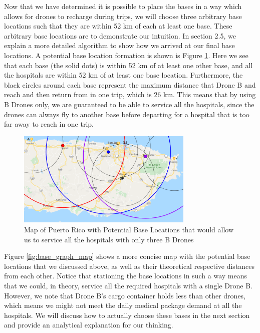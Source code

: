 Now that we have determined it is possible to place the bases in a way which allows for drones to recharge during trips, we will choose three arbitrary base locations such that they are within 52 km of each at least one base. These arbitrary base locations are to demonstrate our intuition. In section 2.5, we explain a more detailed algorithm to show how we arrived at our final base locations. A potential base location formation is shown is Figure \ref{fig:theorhetical_bases}. Here we see that each base (the solid dots) is within 52 km of at least one other base, and all the hospitals are within 52 km of at least one base location. Furthermore, the black circles around each base represent the maximum distance that Drone B and reach and then return from in one trip, which is 26 km. This means that by using B Drones only, we are guaranteed to be able to service all the hospitals, since the drones can always fly to another base before departing for a hospital that is too far away to reach in one trip.

\begin{figure}[!ht]
    \centering
    \includegraphics[width=0.75\textwidth]{theorhetical_bases.png}
    \caption{Map of Puerto Rico with Potential Base Locations that would allow us to service all the hospitals with only three B Drones}
    \label{fig:theorhetical_bases}
\end{figure}

Figure \ref{fig:base_graph_map} shows a more concise map with the potential base locations that we discussed above, as well as their theoretical respective distances from each other. Notice that stationing the base locations in such a way means that we could, in theory, service all the required hospitals with a single Drone B. However, we note that Drone B's cargo container holds less than other drones, which means we might not meet the daily medical package demand at all the hospitals. We will discuss how to actually choose these bases in the next section and provide an analytical explanation for our thinking.

